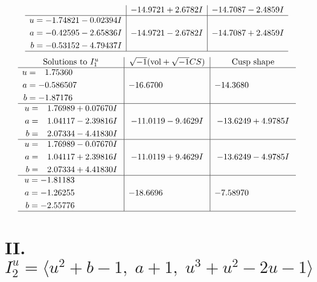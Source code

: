 \documentclass[1p]{elsarticle_modified}
\theoremstyle{definition}
\newcommand{\I}{\sqrt{-1}}
\begin{document}
$$\begin{array}{c|c|c}
 & -14.9721 + 2.6782 I & -14.7087 - 2.4859 I \\ \hline\begin{aligned}
u &= -1.74821 - 0.02394 I \\
a &= -0.42595 - 2.65836 I \\
b &= -0.53152 - 4.79437 I\end{aligned}
 & -14.9721 - 2.6782 I & -14.7087 + 2.4859 I\\
 \hline 
 \end{array}$$\newpage$$\begin{array}{c|c|c}  
\text{Solutions to }I^u_{1}& \I (\text{vol} + \sqrt{-1}CS) & \text{Cusp shape}\\
 \hline 
\begin{aligned}
u &= \phantom{-}1.75360\phantom{ +0.000000I} \\
a &= -0.586507\phantom{ +0.000000I} \\
b &= -1.87176\phantom{ +0.000000I}\end{aligned}
 & -16.6700\phantom{ +0.000000I} & -14.3680\phantom{ +0.000000I} \\ \hline\begin{aligned}
u &= \phantom{-}1.76989 + 0.07670 I \\
a &= \phantom{-}1.04117 - 2.39816 I \\
b &= \phantom{-}2.07334 - 4.41830 I\end{aligned}
 & -11.0119 - 9.4629 I & -13.6249 + 4.9785 I \\ \hline\begin{aligned}
u &= \phantom{-}1.76989 - 0.07670 I \\
a &= \phantom{-}1.04117 + 2.39816 I \\
b &= \phantom{-}2.07334 + 4.41830 I\end{aligned}
 & -11.0119 + 9.4629 I & -13.6249 - 4.9785 I \\ \hline\begin{aligned}
u &= -1.81183\phantom{ +0.000000I} \\
a &= -1.26255\phantom{ +0.000000I} \\
b &= -2.55776\phantom{ +0.000000I}\end{aligned}
 & -18.6696\phantom{ +0.000000I} & -7.58970\phantom{ +0.000000I}\\
 \hline 
 \end{array}$$\newpage\newpage\renewcommand{\arraystretch}{1}
\centering \section*{II. $I^u_{2}= \langle u^2+b-1,\;a+1,\;u^3+u^2-2 u-1 \rangle$}
\end{document}
